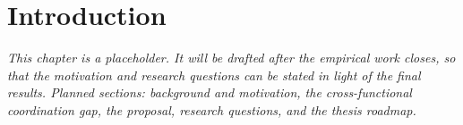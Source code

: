 \chapter{Introduction}
\label{ch:introduction}

\textit{This chapter is a placeholder. It will be drafted after the
empirical work closes, so that the motivation and research questions
can be stated in light of the final results. Planned sections:
background and motivation, the cross-functional coordination gap,
the \NEXUS{} proposal, research questions, and the thesis roadmap.}
